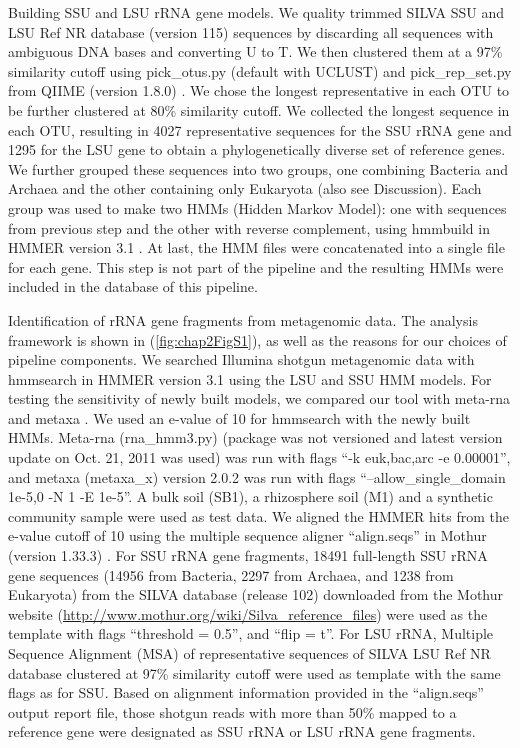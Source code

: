 \documentclass[]{msu-thesis}
\begin{document}
Building SSU and LSU rRNA gene models. We quality trimmed SILVA \cite{quast_silva_2013} SSU and LSU Ref NR database (version 115) sequences by discarding all sequences with ambiguous DNA bases and converting U to T. We then clustered them at a 97\% similarity cutoff using pick\_otus.py (default with UCLUST) and pick\_rep\_set.py from QIIME (version 1.8.0) \cite{kuczynski_using_2012}. We chose the longest representative in each OTU to be further clustered at 80\% similarity cutoff. We collected the longest sequence in each OTU, resulting in 4027 representative sequences for the SSU rRNA gene and 1295 for the LSU gene to obtain a phylogenetically diverse set of reference genes. We further grouped these sequences into two groups, one combining Bacteria and Archaea and the other containing only Eukaryota (also see Discussion). Each group was used to make two HMMs (Hidden Markov Model): one with sequences from previous step and the other with reverse complement, using hmmbuild in HMMER version 3.1 \cite{eddy_new_2009}. At last, the HMM files were concatenated into a single file for each gene. This step is not part of the pipeline and the resulting HMMs were included in the database of this pipeline.

Identification of rRNA gene fragments from metagenomic data. The analysis framework is shown in (\cref{fig:chap2FigS1}), as well as the reasons for our choices of pipeline components. We searched Illumina shotgun metagenomic data with hmmsearch in HMMER version 3.1 \cite{eddy_new_2009} using the LSU and SSU HMM models. For testing the sensitivity of newly built models, we compared our tool with meta-rna \cite{huang_identification_2009} and metaxa \cite{bengtsson_metaxa:_2011}. We used an e-value of 10 for hmmsearch with the newly built HMMs. Meta-rna (rna\_hmm3.py) (package was not versioned and latest version update on Oct. 21, 2011 was used) was run with flags ``-k euk,bac,arc -e 0.00001'', and metaxa (metaxa\_x) version 2.0.2 was run with flags ``--allow\_single\_domain 1e-5,0 -N 1 -E 1e-5''. A bulk soil (SB1), a rhizosphere soil (M1) and a synthetic community sample \cite{shakya_comparative_2013} were used as test data. We aligned the HMMER hits from the e-value cutoff of 10 using the multiple sequence aligner ``align.seqs'' in Mothur (version 1.33.3) \cite{schloss_high-throughput_2009}. For SSU rRNA gene fragments, 18491 full-length SSU rRNA gene sequences (14956 from Bacteria, 2297 from Archaea, and 1238 from Eukaryota) from the SILVA database (release 102) \cite{quast_silva_2013} downloaded from the Mothur website (\url{http://www.mothur.org/wiki/Silva\_reference\_files}) were used as the template with flags ``threshold = 0.5'', and ``flip = t''. For LSU rRNA, Multiple Sequence Alignment (MSA) of representative sequences of SILVA LSU Ref NR database clustered at 97\% similarity cutoff were used as template with the same flags as for SSU. Based on alignment information provided in the ``align.seqs'' output report file, those shotgun reads with more than 50\% mapped to a reference gene were designated as SSU rRNA or LSU rRNA gene fragments.
\end{document}
